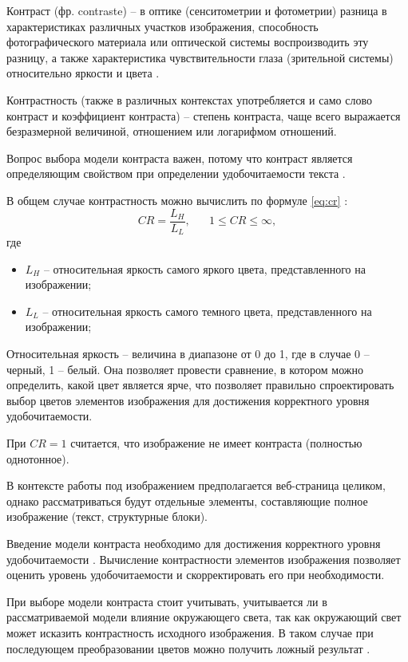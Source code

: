 Контраст (фр. contraste) -- в оптике (сенситометрии и фотометрии) разница в характеристиках различных участков изображения, способность фотографического материала или оптической системы воспроизводить эту разницу, а также характеристика чувствительности глаза (зрительной системы) относительно яркости и цвета \cite{contrast}.

Контрастность (также в различных контекстах употребляется и само слово контраст и коэффициент контраста) -- степень контраста, чаще всего выражается безразмерной величиной, отношением или логарифмом отношений.

Вопрос выбора модели контраста важен, потому что контраст является определяющим свойством при определении удобочитаемости текста \cite{wcag1}.

В общем случае контрастность можно вычислить по формуле \ref{eq:cr} \cite{weber}:
\begin{equation}
	\label{eq:cr}
	CR=\frac{L_H}{L_L}, \text{~~~~~$1 \le CR \le \infty$},
\end{equation}
где
\begin{itemize}
	\item $L_H$ -- относительная яркость \cite{relativeluminance} самого яркого цвета, представленного на изображении;
	\item $L_L$ -- относительная яркость самого темного цвета, представленного на изображении;
\end{itemize}

Относительная яркость -- величина в диапазоне от 0 до 1, где в случае 0 -- черный, 1 -- белый. Она позволяет провести сравнение, в котором можно определить, какой цвет является ярче, что позволяет правильно спроектировать выбор цветов элементов изображения для достижения корректного уровня удобочитаемости.

При $CR = 1$ считается, что изображение не имеет контраста (полностью однотонное).

В контексте работы под изображением предполагается веб-страница целиком, однако рассматриваться будут отдельные элементы, составляющие полное изображение (текст, структурные блоки). 

Введение модели контраста необходимо для достижения корректного уровня удобочитаемости \cite{wcag}. Вычисление контрастности элементов изображения позволяет оценить уровень удобочитаемости и скорректировать его при необходимости.

При выборе модели контраста стоит учитывать, учитывается ли в рассматриваемой модели влияние окружающего света, так как окружающий свет может исказить контрастность исходного изображения. В таком случае при последующем преобразовании цветов можно получить ложный результат \cite{ambientlightcontrast}.

